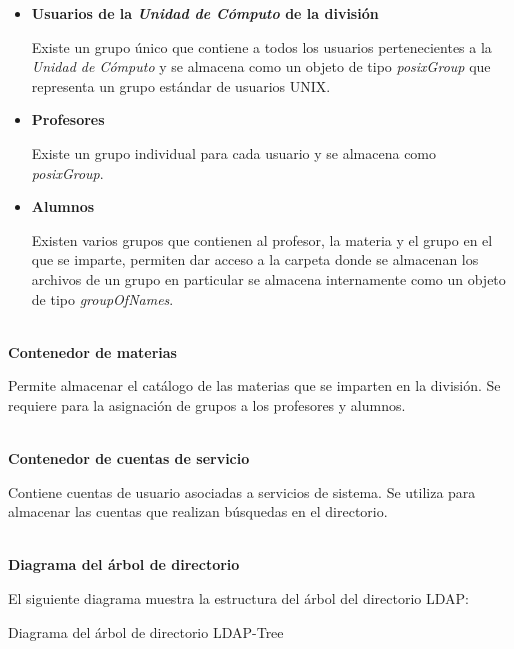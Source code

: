 \begin{itemize}

  \item \textbf{Usuarios de la \textsl{Unidad de C\'{o}mputo} de la divisi\'{o}n}

  Existe un grupo \'{u}nico que contiene a todos los usuarios pertenecientes a la \textit{Unidad de C\'{o}mputo} y se almacena como un objeto de tipo \textit{posixGroup} que representa un grupo est\'{a}ndar de usuarios \textsc{UNIX}.

  \item \textbf{Profesores}

  Existe un grupo individual para cada usuario y se almacena como \textit{posixGroup}.

  \item \textbf{Alumnos}

  Existen varios grupos que contienen al profesor, la materia y el grupo en el que se imparte, permiten dar acceso a la carpeta donde se almacenan los archivos de un grupo en particular se almacena internamente como un objeto de tipo \textit{groupOfNames}.

\end{itemize}

\newpage
\textbf{\\ Contenedor de materias \\}

Permite almacenar el cat\'{a}logo de las materias que se imparten en la divisi\'{o}n. Se requiere para la asignaci\'{o}n de grupos a los profesores y alumnos.

\textbf{\\ Contenedor de cuentas de servicio \\}

Contiene cuentas de usuario asociadas a servicios de sistema. Se utiliza para almacenar las cuentas que realizan b\'{u}squedas en el directorio.

\textbf{\\ Diagrama del \'{a}rbol de directorio \\}

El siguiente diagrama muestra la estructura del \'{a}rbol del directorio \textsc{LDAP}:

\diagramblock
{Diagrama del \'{a}rbol de directorio}
{LDAP-Tree}
{
 {
  
 }
}

